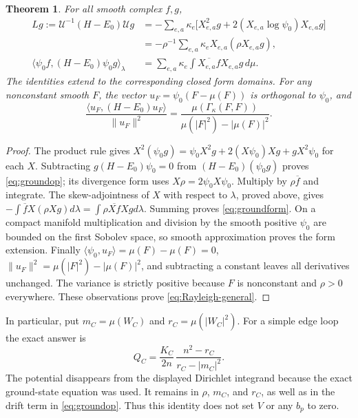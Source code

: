 \documentclass[11pt]{article}
\newtheorem{theorem}{Theorem}
\theoremstyle{definition}
\begin{document}
\begin{theorem}\label{thm:ground-transform}
For all smooth complex $f,g$,
\begin{align}
 Lg:=\mathcal U^{-1}(H-E_0)\mathcal Ug
 &=-\sum_{e,a}\kappa_e
       \bigl[X_{e,a}^2g+2(X_{e,a}\log\psi_0)X_{e,a}g\bigr]
       \label{eq:groundop}\\
 &=-\rho^{-1}\sum_{e,a}\kappa_e X_{e,a}(\rho X_{e,a}g),\nonumber\\
 \langle\psi_0f,(H-E_0)\psi_0g\rangle_\lambda
 &=\sum_{e,a}\kappa_e\int\overline{X_{e,a}f}X_{e,a}g\,d\mu.
 \label{eq:groundform}
\end{align}
The identities extend to the corresponding closed form domains. For any
nonconstant smooth $F$, the vector
$u_F=\psi_0(F-\mu(F))$ is orthogonal to $\psi_0$, and
\begin{equation}\label{eq:Rayleigh-general}
 \frac{\langle u_F,(H-E_0)u_F\rangle}{\|u_F\|^2}
 =\frac{\mu(\Gamma_\kappa(F,F))}
        {\mu(|F|^2)-|\mu(F)|^2}.
\end{equation}
\end{theorem}
\begin{proof}
The product rule gives
$X^2(\psi_0g)=\psi_0X^2g+2(X\psi_0)Xg+gX^2\psi_0$ for each $X$.
Subtracting $g(H-E_0)\psi_0=0$ from $(H-E_0)(\psi_0g)$ proves
\eqref{eq:groundop}; its divergence form uses $X\rho=2\psi_0X\psi_0$.
Multiply by $\rho\overline f$ and integrate. The skew-adjointness of
$X$ with respect to $\lambda$, proved above, gives
$-\int\overline f X(\rho Xg)d\lambda
=\int\rho\overline{Xf}Xg d\lambda$. Summing proves
\eqref{eq:groundform}. On a compact manifold multiplication and division
by the smooth positive $\psi_0$ are bounded on the first Sobolev space,
so smooth approximation proves the form extension. Finally
$\langle\psi_0,u_F\rangle=\mu(F)-\mu(F)=0$,
$\|u_F\|^2=\mu(|F|^2)-|\mu(F)|^2$, and subtracting a constant leaves
all derivatives unchanged. The variance is strictly positive because
$F$ is nonconstant and $\rho>0$ everywhere. These observations prove
\eqref{eq:Rayleigh-general}.
\end{proof}

In particular, put $m_C=\mu(W_C)$ and $r_C=\mu(|W_C|^2)$. For a simple
edge loop the exact answer is
\begin{equation}\label{eq:Rayleigh-loop}
 Q_C=\frac{K_C}{2n}\,
       \frac{n^2-r_C}{r_C-|m_C|^2}.
\end{equation}
The potential disappears from the displayed Dirichlet integrand because
the exact ground-state equation was used. It remains in $\rho$, $m_C$,
and $r_C$, as well as in the drift term in \eqref{eq:groundop}. Thus
this identity does not set $V$ or any $b_p$ to zero.
\end{document}
